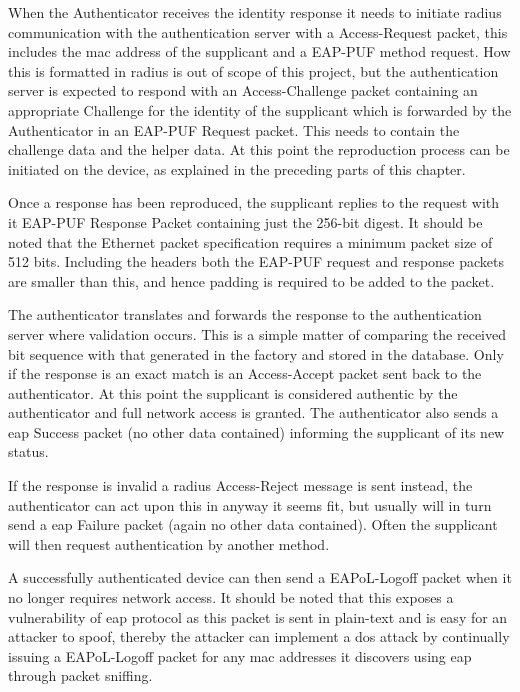 When the Authenticator receives the identity response it needs to initiate \gls{radius}
communication with the authentication server with a Access-Request packet, this
includes the \gls{mac} address of the supplicant and a EAP-PUF method request. How this
is formatted in \gls{radius} is out of scope of this project, but the authentication
server is expected to respond with an Access-Challenge packet containing an
appropriate Challenge for the identity of the supplicant which is forwarded by
the Authenticator in an EAP-PUF Request packet. This needs to contain the
challenge data and the helper data. At this
point the reproduction process can be initiated on the device, as explained in
the preceding parts of this chapter.

Once a response has been reproduced, the supplicant replies to the request with
it EAP-PUF Response Packet containing just the 256-bit digest. It should be noted
that the Ethernet packet specification requires a minimum packet size of 512 bits.
Including the headers both the EAP-PUF request and response packets are smaller
than this, and hence padding is required to be added to the packet.

The authenticator translates and forwards the response to the authentication server
where validation occurs. This is a simple matter of comparing the received bit
sequence with that generated in the factory and stored in the database. Only if
the response is an exact match is an Access-Accept packet sent back to the
authenticator. At this point the supplicant is considered authentic by the
authenticator and full network access is granted. The authenticator also sends
a \gls{eap} Success packet (no other data contained) informing the supplicant of its
new status.

If the response is invalid a \gls{radius} Access-Reject message is sent instead,
the authenticator can act upon this in anyway it seems fit, but usually will in
turn send a \gls{eap} Failure packet (again no other data contained). Often
the supplicant will then request authentication by another method.

A successfully authenticated device can then send a EAPoL-Logoff packet when it
no longer requires network access. It should be noted that this exposes a
vulnerability of \gls{eap} protocol as this packet is sent in plain-text and is easy for
an attacker to spoof, thereby the attacker can implement a \gls{dos} attack by
continually issuing a EAPoL-Logoff packet for any \gls{mac} addresses it discovers
using \gls{eap} through packet sniffing.

